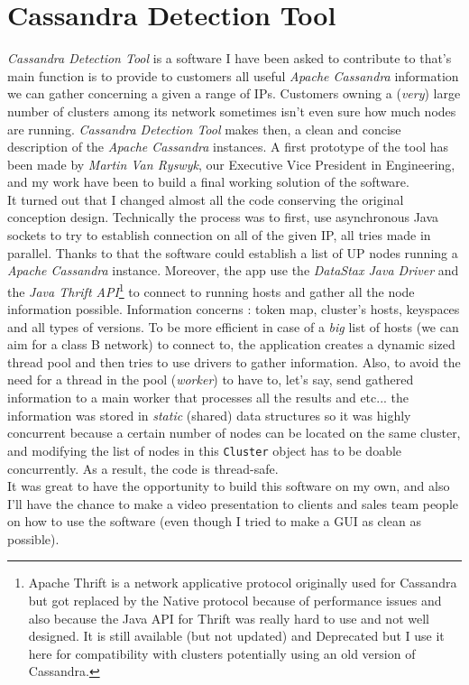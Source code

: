 \documentclass[a4paper]{report}
\newcommand{\djd}{\emph{DataStax Java Driver\xspace}}
\newcommand{\ca}{\emph{Apache Cassandra\xspace}}
\begin{document}
\section{Cassandra Detection Tool}
\emph{Cassandra Detection Tool} is a software I have been asked to contribute to that's main function is to provide to customers all useful \ca{} information we can gather concerning a given a range of IPs. Customers owning a (\emph{very}) large number of clusters among its network sometimes isn't even sure how much nodes are running. \emph{Cassandra Detection Tool} makes then, a clean and concise description of the \ca{} instances. 
A first prototype of the tool has been made by \emph{Martin Van Ryswyk}, our Executive Vice President in Engineering, and my work have been to build a final working solution of the software.\\
It turned out that I changed almost all the code conserving the original conception design. Technically the process was to first, use asynchronous Java sockets to try to establish connection on all of the given IP, all tries made in parallel. Thanks to that the software could establish a list of UP nodes running a \ca{} instance. Moreover, the app use the \djd{} and  the \emph{Java Thrift API}\footnote{Apache Thrift is a network applicative protocol originally used for Cassandra but got replaced by the Native protocol because of performance issues and also because the Java API for Thrift was really hard to use and not well designed. It is still available (but not updated) and Deprecated but I use it here for compatibility with clusters potentially using an old version of Cassandra.}
to connect to running hosts and gather all the node information possible. Information concerns : token map, cluster's hosts, keyspaces and all types of versions. To be more efficient in case of a \emph{big} list of hosts (we can aim for a class B network) to connect to, the application creates a dynamic sized thread pool and then tries to use drivers to gather information. Also, to avoid the need for a thread in the pool (\emph{worker}) to have to, let's say, send gathered information to a main worker that processes all the results and etc... the information was stored in \emph{static} (shared) data structures so it was highly concurrent because a certain number of nodes can be located on the same cluster, and modifying the list of nodes in this \verb;Cluster; object has to be doable concurrently. As a result, the code is thread-safe.\\
It was great to have the opportunity to build this software on my own, and also I'll have the chance to make a video presentation to clients and sales team people on how to use the software (even though I tried to make a GUI as clean as possible).
\end{document}
